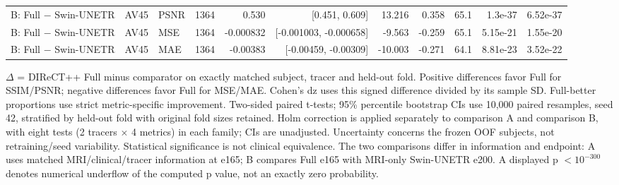 \begin{table}[t]
{\begin{tabular}{lllrrrrrrrr}
B: Full $-$ Swin-UNETR & AV45 & PSNR & 1364 & 0.530 & [0.451, 0.609] & 13.216 & 0.358 & 65.1 & 1.3e-37 & 6.52e-37 \\
B: Full $-$ Swin-UNETR & AV45 & MSE & 1364 & -0.000832 & [-0.001003, -0.000658] & -9.563 & -0.259 & 65.1 & 5.15e-21 & 1.55e-20 \\
B: Full $-$ Swin-UNETR & AV45 & MAE & 1364 & -0.00383 & [-0.00459, -0.00309] & -10.003 & -0.271 & 64.1 & 8.81e-23 & 3.52e-22 \\
\hline
\end{tabular}}
\par\smallskip
\begin{minipage}{\textwidth}\footnotesize
$\Delta$ = DIReCT++ Full minus comparator on exactly matched subject, tracer and held-out fold. Positive differences favor Full for SSIM/PSNR; negative differences favor Full for MSE/MAE. Cohen's dz uses this signed difference divided by its sample SD. Full-better proportions use strict metric-specific improvement. Two-sided paired t-tests; 95\% percentile bootstrap CIs use 10,000 paired resamples, seed 42, stratified by held-out fold with original fold sizes retained. Holm correction is applied separately to comparison A and comparison B, with eight tests (2 tracers $\times$ 4 metrics) in each family; CIs are unadjusted. Uncertainty concerns the frozen OOF subjects, not retraining/seed variability. Statistical significance is not clinical equivalence. The two comparisons differ in information and endpoint: A uses matched MRI/clinical/tracer information at e165; B compares Full e165 with MRI-only Swin-UNETR e200. A displayed p $<10^{-300}$ denotes numerical underflow of the computed p value, not an exactly zero probability.
\end{minipage}
\end{table}
